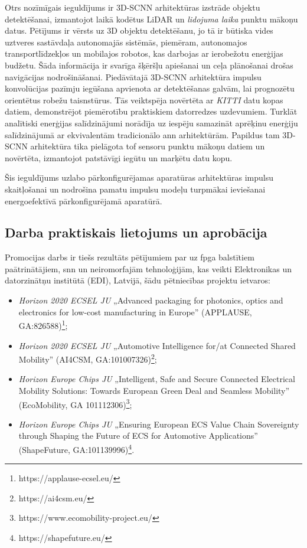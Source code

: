 Otrs nozīmīgais ieguldījums ir 3D-SCNN arhitektūras izstrāde objektu detektēšanai, izmantojot laikā kodētus LiDAR un
\textit{lidojuma laika}  punktu mākoņu datus. Pētījums ir vērsts uz 3D objektu detektēšanu, jo tā ir būtiska vides uztveres sastāvdaļa
autonomajās sistēmās, piemēram, autonomajos transportlīdzekļos un mobilajos robotos, kas darbojas ar ierobežotu enerģijas
budžetu. Šāda informācija ir svarīga šķēršļu apiešanai un ceļa plānošanai drošas navigācijas nodrošināšanai. Piedāvātajā
3D-SCNN arhitektūra
impulsu konvolūcijas pazīmju iegūšana
apvienota ar detektēšanas galvām, lai prognozētu orientētus robežu taisnstūrus. Tās veiktspēja novērtēta ar
\textit{KITTI} datu kopas
datiem, demonstrējot piemērotību praktiskiem datorredzes uzdevumiem. Turklāt
analītiski enerģijas salīdzinājumi norādīja uz iespēju samazināt aprēķinu enerģiju salīdzinājumā ar ekvivalentām tradicionālo
\Gls{ann} arhitektūrām.
Papildus tam 3D-SCNN arhitektūra tika pielāgota \Gls{tof} sensoru punktu mākoņu datiem un novērtēta, izmantojot patstāvīgi
iegūtu un marķētu datu kopu.

Šis ieguldījums uzlabo pārkonfigurējamas aparatūras arhitektūras impulsu skaitļošanai un nodrošina pamatu impulsu modeļu
turpmākai ieviešanai energoefektīvā pārkonfigurējamā aparatūrā.

\subsection{Darba praktiskais lietojums un aprobācija}
Promocijas darbs ir tiešs rezultāts pētījumiem par uz \Gls{fpga} balstītiem paātrinātājiem, \Gls{snn} un neiromorfajām
tehnoloģijām, kas veikti Elektronikas un datorzinātņu institūtā (EDI), Latvijā, šādu pētniecības projektu ietvaros:
\begin{itemize}
\item \textit{Horizon 2020 ECSEL JU} „Advanced packaging for photonics, optics and electronics for low-cost manufacturing in Europe” (APPLAUSE, GA:826588)\footnote{https://applause-ecsel.eu/};
\item \textit{Horizon 2020 ECSEL JU} „Automotive Intelligence for/at Connected Shared Mobility” (AI4CSM, GA:101007326)\footnote{https://ai4csm.eu/};
\item \textit{Horizon Europe Chips JU} „Intelligent, Safe and Secure Connected Electrical Mobility Solutions: Towards European Green Deal and Seamless Mobility” (EcoMobility, GA 101112306)\footnote{https://www.ecomobility-project.eu/};
\item \textit{Horizon Europe Chips JU} „Ensuring European ECS Value Chain Sovereignty through Shaping the Future of ECS for Automotive Applications” (ShapeFuture, GA:101139996)\footnote{https://shapefuture.eu/}.
\end{itemize}


